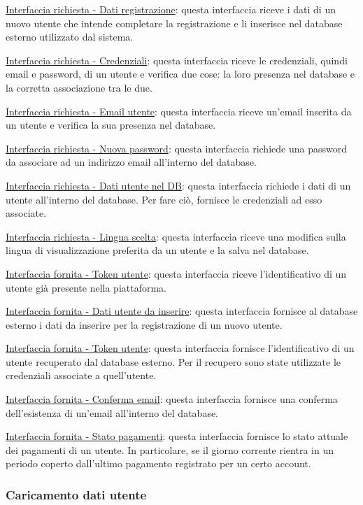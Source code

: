 \documentclass[a4paper,12pt]{article}
\begin{document}
\underline{Interfaccia richiesta - Dati registrazione}: questa interfaccia riceve i dati di un nuovo utente che intende completare la registrazione e li inserisce nel database esterno utilizzato dal sistema.

\underline{Interfaccia richiesta - Credenziali}: questa interfaccia riceve le credenziali, quindi email e password, di un utente e verifica due cose: la loro presenza nel database e la corretta associazione tra le due.

\underline{Interfaccia richiesta - Email utente}: questa interfaccia riceve un’email inserita da un utente e verifica la sua presenza nel database.

\underline{Interfaccia richiesta - Nuova password}: questa interfaccia richiede una password da associare ad un indirizzo email all’interno del database.

\underline{Interfaccia richiesta - Dati utente nel DB}: questa interfaccia richiede i dati di un utente all’interno del database. Per fare ciò, fornisce le credenziali ad esso associate.

\underline{Interfaccia richiesta - Lingua scelta}: questa interfaccia riceve una modifica sulla lingua di visualizzazione preferita da un utente e la salva nel database.

\underline{Interfaccia fornita - Token utente}: questa interfaccia riceve l’identificativo di un utente già presente nella piattaforma.

\underline{Interfaccia fornita - Dati utente da inserire}: questa interfaccia fornisce al database esterno i dati da inserire per la registrazione di un nuovo utente.

\underline{Interfaccia fornita - Token utente}: questa interfaccia fornisce l’identificativo di un utente recuperato dal database esterno. Per il recupero sono state utilizzate le credenziali associate a quell’utente.

\underline{Interfaccia fornita - Conferma email}: questa interfaccia fornisce una conferma dell’esistenza di un’email all’interno del database.

\underline{Interfaccia fornita - Stato pagamenti}: questa interfaccia fornisce lo stato attuale dei pagamenti di un utente. In particolare, se il giorno corrente rientra in un periodo coperto dall’ultimo pagamento registrato per un certo account.

\subsubsection{Caricamento dati utente}
\end{document}
